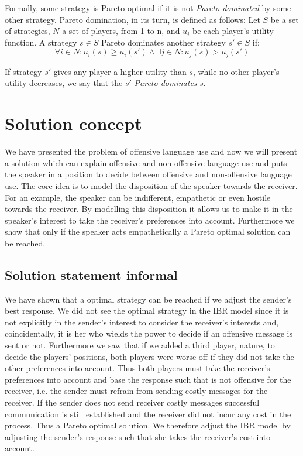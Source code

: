 \documentclass[10]{article}
\begin{document}
Formally, some strategy is Pareto optimal if it is not \textit{Pareto dominated} by some other strategy. Pareto domination, in its turn, is defined as follows:
Let $S$ be a set of strategies, $N$ a set of players, from 1 to n, and $u_i$ be each player's utility function. A strategy $s \in S$ Pareto dominates another strategy $s' \in S$ if:
\begin{equation*}
\forall i \in N: u_i(s) \geq u_i(s') \land \exists j \in N: u_j(s) > u_j(s')
\end{equation*}

If strategy $s'$ gives any player a higher utility than $s$, while no other player's utility decreases, we say that the $s'$ \textit{Pareto dominates} $s$.


\section{Solution concept}
We have presented the problem of offensive language use and now we will present a solution which can explain offensive and non-offensive language use and puts the speaker in a position to decide between offensive and non-offensive language use. The core idea is to model the disposition of the speaker towards the receiver. For an example, the speaker can be indifferent, empathetic or even hostile towards the receiver. By modelling this disposition it allows us to make it in the speaker's interest to take the receiver's preferences into account. Furthermore we show that only if the speaker acts empathetically a Pareto optimal solution can be reached.

\subsection{Solution statement informal}
We have shown that a optimal strategy can be reached if we adjust the sender's best response. We did not see the optimal strategy in the IBR model since it is not explicitly in the sender's interest to consider the receiver's interests and, coincidentally, it is her who wields the power to decide if an offensive message is sent or not. Furthermore we saw that if we added a third player, nature, to decide the players' positions, both players were worse off if they did not take the other preferences into account. Thus both players must take the receiver's preferences into account and base the response such that is not offensive for the receiver, i.e. the sender must refrain from sending costly messages for the receiver. If the sender does not send receiver costly messages successful communication is still established and the receiver did not incur any cost in the process. Thus a Pareto optimal solution. We therefore adjust the IBR model by adjusting the sender's response such that she takes the receiver's cost into account.
\end{document}
